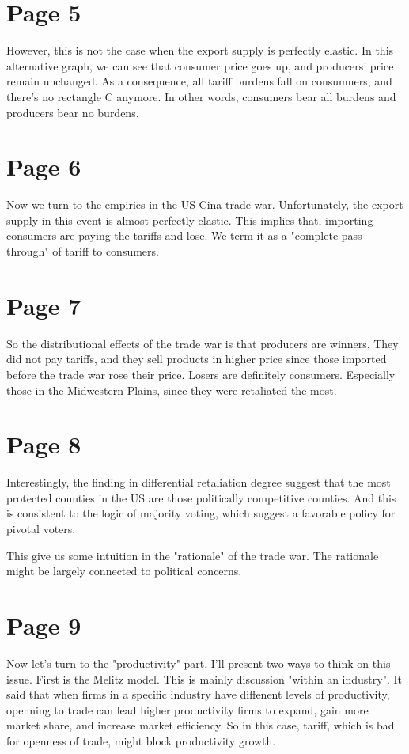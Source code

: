 \documentclass[12pt]{article}
\begin{document}
\section*{Page 5}
However, this is not the case when the export supply is perfectly elastic.
In this alternative graph, we can see that consumer price goes up, and producers' price remain unchanged.
As a consequence, all tariff burdens fall on consumners, and there's no rectangle C anymore.
In other words, consumers bear all burdens and producers bear no burdens.

\section*{Page 6}
Now we turn to the empirics in the US-Cina trade war.
Unfortunately, the export supply in this event is almost perfectly elastic.
This implies that, importing consumers are paying the tariffs and lose.
We term it as a "complete pass-through" of tariff to consumers.

\section*{Page 7}
So the distributional effects of the trade war is that producers are winners. 
They did not pay tariffs, and they sell products in higher price since those imported before the trade war rose their price.
Losers are definitely consumers.
Especially those in the Midwestern Plains, since they were retaliated the most.

\section*{Page 8}
Interestingly, the finding in differential retaliation degree suggest 
that the most protected counties in the US are those politically competitive counties. 
And this is consistent to the logic of majority voting, 
which suggest a favorable policy for pivotal voters.

This give us some intuition in the "rationale" of the trade war. 
The rationale might be largely connected to political concerns.

\section*{Page 9}
Now let's turn to the "productivity" part.
I'll present two ways to think on this issue.
First is the Melitz model. This is mainly discussion "within an industry".
It said that when firms in a specific industry have diffenent levels of productivity, 
openning to trade can lead higher productivity firms to expand, gain more market share, and increase market efficiency.
So in this case, tariff, which is bad for openness of trade, might block productivity growth.
\end{document}
